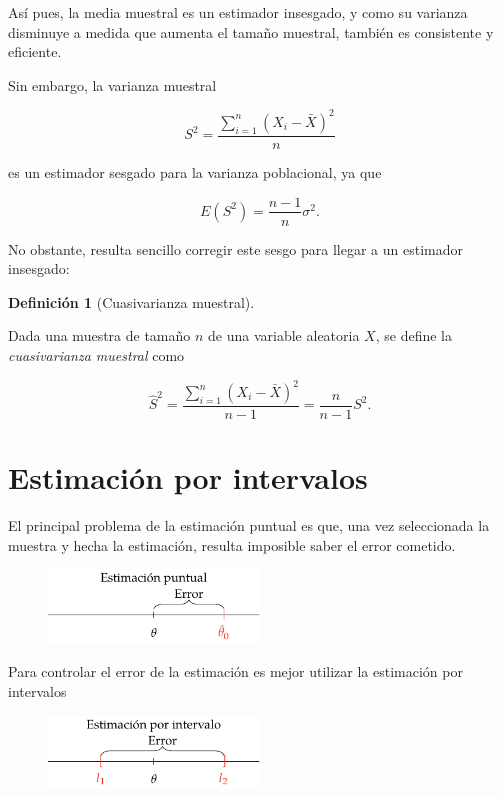 \documentclass[
  a4paper,
]{scrreport}
\theoremstyle{plain}
\theoremstyle{definition}
\theoremstyle{definition}
\newtheorem{definition}{Definición}[chapter]
\theoremstyle{remark}
\begin{document}
Así pues, la media muestral es un estimador insesgado, y como su
varianza disminuye a medida que aumenta el tamaño muestral, también es
consistente y eficiente.

Sin embargo, la varianza muestral

\[
S^2 = \frac{\sum_{i=1}^n (X_i-\bar X)^2}{n}
\]

es un estimador sesgado para la varianza poblacional, ya que

\[
E(S^2)= \frac{n-1}{n}\sigma^2.
\]

No obstante, resulta sencillo corregir este sesgo para llegar a un
estimador insesgado:

\begin{definition}[Cuasivarianza
muestral]\protect\hypertarget{def-cuasivarianza-muestral}{}\label{def-cuasivarianza-muestral}

Dada una muestra de tamaño \(n\) de una variable aleatoria \(X\), se
define la \emph{cuasivarianza muestral} como

\[
\hat{S}^2 = \frac{\sum_{i=1}^n (X_i-\bar X)^2}{n-1} = \frac{n}{n-1}S^2.
\]

\end{definition}

\hypertarget{estimaciuxf3n-por-intervalos}{%
\section{Estimación por intervalos}\label{estimaciuxf3n-por-intervalos}}

El principal problema de la estimación puntual es que, una vez
seleccionada la muestra y hecha la estimación, resulta imposible saber
el error cometido.

\begin{figure}

{\centering \includegraphics[width=0.5\textwidth,height=\textheight]{img/estimacion/error-estimacion-puntual.pdf}

}

\end{figure}

Para controlar el error de la estimación es mejor utilizar la estimación
por intervalos

\begin{figure}

{\centering \includegraphics[width=0.5\textwidth,height=\textheight]{img/estimacion/error-estimacion-intervalo.pdf}

}

\end{figure}
\end{document}
